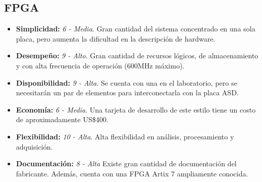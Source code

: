 \subsection{FPGA}
\begin{itemize}
	\item \textbf{Simplicidad:}  \textit{6 - Media}. Gran cantidad del sistema concentrado en una sola placa, pero aumenta la dificultad en la descripción de hardware.
	\item \textbf{Desempeño:}  \textit{9 - Alto}. Gran cantidad de recursos lógicos, de almacenamiento y con alta  frecuencia de operación (600MHz máximo).
	\item \textbf{Disponibilidad: } \textit{9 - Alta}. Se cuenta con una en el laboratorio, pero se necesitarán un par de elementos para interconectarla con la placa ASD.
	\item \textbf{Economía: }\textit{6 - Media}. Una tarjeta de desarrollo de este estilo tiene un costo de aproximadamente US\$400.
	\item \textbf{Flexibilidad:} \textit{10 - Alta}. Alta flexibilidad en análisis, procesamiento y adquisición.
	\item \textbf{Documentación:} \textit{8 - Alta} Existe gran cantidad de documentación del fabricante. Además, cuenta con una FPGA Artix 7 ampliamente conocida.
\end{itemize}
%
%


